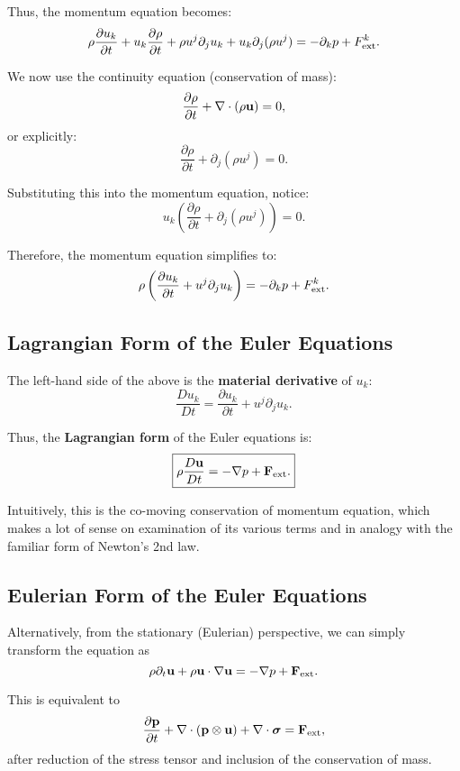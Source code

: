 Thus, the momentum equation becomes:
\[
\rho \frac{\partial u_k}{\partial t} + u_k \frac{\partial \rho}{\partial t} + \rho u^j \partial_j u_k + u_k \partial_j ( \rho u^j ) = - \partial_k p + F^k_{\rm ext}.
\]

We now use the continuity equation (conservation of mass):
\[
\frac{\partial \rho}{\partial t} + \nabla \cdot ( \rho {\bf u} ) = 0,
\]
or explicitly:
\[
\frac{\partial \rho}{\partial t} + \partial_j ( \rho u^j ) = 0.
\]

Substituting this into the momentum equation, notice:
\[
u_k \left( \frac{\partial \rho}{\partial t} + \partial_j ( \rho u^j ) \right) = 0.
\]

Therefore, the momentum equation simplifies to:
\[
\rho \left( \frac{\partial u_k}{\partial t} + u^j \partial_j u_k \right) = - \partial_k p + F^k_{\rm ext}.
\]

\subsection*{Lagrangian Form of the Euler Equations}

The left-hand side of the above is the \textbf{material derivative} of $u_k$:
\[
\frac{D u_k}{D t} = \frac{\partial u_k}{\partial t} + u^j \partial_j u_k.
\]

Thus, the \textbf{Lagrangian form} of the Euler equations is:
\begin{equation}
\label{eq:momentum_lagrangian}
\boxed{
\rho \frac{D {\bf u}}{D t} = - \nabla p + {\bf F}_{\rm ext}.
}
\end{equation}

Intuitively, this is the co-moving conservation of momentum equation, which makes a lot of sense on examination of its various terms and in analogy with the familiar form of Newton's 2nd law.

\subsection*{Eulerian Form of the Euler Equations}

Alternatively, from the stationary (Eulerian) perspective, we can simply transform the equation as
\[
\rho \partial_t {\bf u} + \rho {\bf u}\cdot \nabla {\bf u} = - \nabla p + {\bf F}_{\rm ext}.
\]

This is equivalent to 
\[
\frac{\partial {\bf p}}{\partial t} + \nabla \cdot ({\bf p} \otimes {\bf u}) + \nabla \cdot \boldsymbol{\sigma} = {\bf F}_{\rm ext},
\]
after reduction of the stress tensor and inclusion of the conservation of mass.

